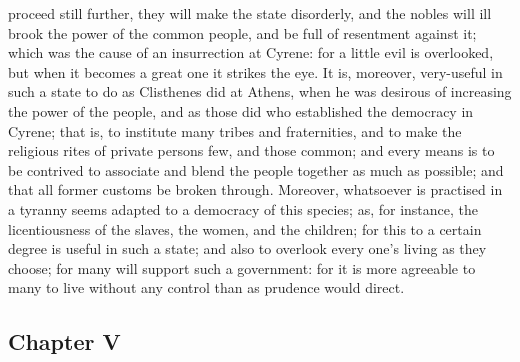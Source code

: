 \documentclass[12pt]{article}
\begin{document}
proceed still further, they will make the state disorderly, and the nobles will ill brook the power of the common people, and be full of resentment against it; which was the cause of an insurrection at Cyrene: for a little evil is overlooked, but when it becomes a great one it strikes the eye. It is, moreover, very-useful in such a state to do as Clisthenes did at Athens, when he was desirous of increasing the power of the people, and as those did who established the democracy in Cyrene; that is, to institute many tribes and fraternities, and to make the religious rites of private persons few, and those common; and every means is to be contrived to associate and blend the people together as much as possible; and that all former customs be broken through. Moreover, whatsoever is practised in a tyranny seems adapted to a democracy of this species; as, for instance, the licentiousness of the slaves, the women, and the children; for this to a certain degree is useful in such a state; and also to overlook every one's living as they choose; for many will support such a government: for it is more agreeable to many to live without any control than as prudence would direct.

\subsection*{Chapter V}
\end{document}
